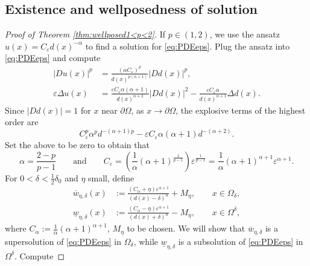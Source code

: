 \documentclass[12pt,reqno]{amsart}
\numberwithin{figure}{section}
\theoremstyle{plain}
\theoremstyle{remark}
\numberwithin{equation}{section}
\begin{document}
\subsection*{Existence and wellposedness of solution}
\begin{proof} [Proof of Theorem \ref{thm:wellposed1<p<2}] If $p\in (1,2)$, we use the ansatz $ u(x) = C_\varepsilon d(x)^{-\alpha}$ to find a solution for \eqref{eq:PDEeps}. Plug the ansatz into \eqref{eq:PDEeps} and compute 
\begin{equation*}
\begin{split}
    |Du (x)|^p &= \frac{(\alpha C_\varepsilon)^p }{d(x)^{p(\alpha+1)}}|D d(x)|^p,\\
    \varepsilon\Delta u(x) &= \frac{\varepsilon C_\varepsilon\alpha(\alpha+1)}{d(x)^{\alpha+2}}|D d(x)|^2 - \frac{\varepsilon C_\varepsilon\alpha}{d(x)^{\alpha+1}}\Delta d(x).
\end{split}
\end{equation*}
Since $|D d(x)| = 1$ for $x$ near $\partial\Omega$, as $x\to \partial \Omega$, the explosive terms of the highest order are
\begin{equation*}
         C_\varepsilon^p \alpha^p d^{-(\alpha+1)p}  -\varepsilon C_\varepsilon \alpha(\alpha+1)d^{-(\alpha+2)}.
\end{equation*}
Set the above to be zero to obtain that
\begin{equation}\label{e:relation}
    \displaystyle\alpha = \frac{2-p}{p-1} \qquad\text{and}\qquad C_\varepsilon = \left(\frac{1}{\alpha}(\alpha+1)^\frac{1}{p-1}\right) \varepsilon^{\frac{1}{p-1}} = \frac{1}{\alpha}(\alpha+1)^{\alpha+1}\varepsilon^{\alpha+1}.
\end{equation}
For $0<\delta < \frac{1}{2}\delta_0$ and $\eta$ small, define
\begin{equation*}
\begin{split}
    \overline{w}_{\eta,\delta}(x) &:= \frac{(C_\alpha+\eta)\varepsilon^{\alpha+1}}{(d(x)-\delta)^\alpha} + M_\eta, \qquad x\in \Omega_\delta,\\
    \underline{w}_{\eta,\delta}(x) &:= \frac{(C_\alpha-\eta)\varepsilon^{\alpha+1}}{(d(x)+\delta)^\alpha} - M_\eta, \qquad x\in \Omega^\delta,
\end{split}
\end{equation*}
where $C_\alpha := \frac{1}{\alpha} (\alpha+1)^{\alpha+1} $, $M_\eta$ to be chosen. We will show that $\overline{w}_{\eta,\delta}$ is a supersolution of \eqref{eq:PDEeps} in $\Omega_\delta$, while $\underline{w}_{\eta,\delta}$ is a subsolution of \eqref{eq:PDEeps} in $\Omega^\delta$. Compute

\end{proof}
\end{document}
